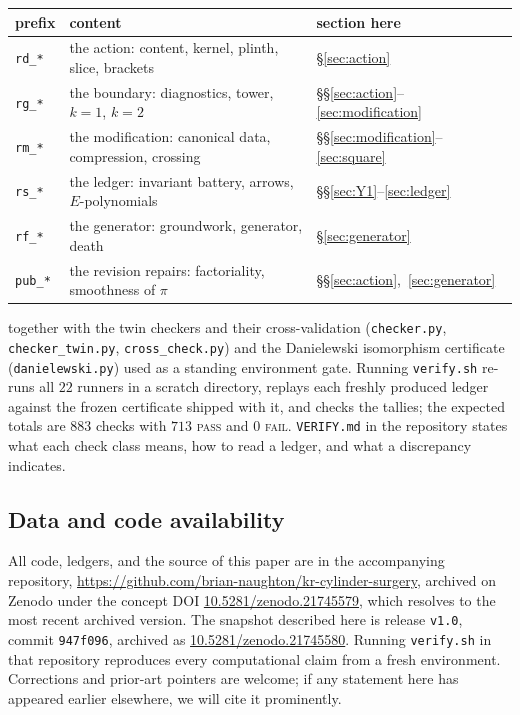 \documentclass[11pt]{article}
\theoremstyle{definition}
\theoremstyle{remark}
\begin{document}
\begin{center}
\begin{tabular}{lll}
\hline
prefix & content & section here\\\hline
\texttt{rd\_*} & the action: content, kernel, plinth, slice, brackets &
\S\ref{sec:action}\\
\texttt{rg\_*} & the boundary: diagnostics, tower, $k=1$, $k=2$ &
\S\S\ref{sec:action}--\ref{sec:modification}\\
\texttt{rm\_*} & the modification: canonical data, compression, crossing &
\S\S\ref{sec:modification}--\ref{sec:square}\\
\texttt{rs\_*} & the ledger: invariant battery, arrows, $E$-polynomials &
\S\S\ref{sec:Y1}--\ref{sec:ledger}\\
\texttt{rf\_*} & the generator: groundwork, generator, death &
\S\ref{sec:generator}\\
\texttt{pub\_*} & the revision repairs: factoriality, smoothness of $\pi$ &
\S\S\ref{sec:action},~\ref{sec:generator}\\
\hline
\end{tabular}
\end{center}

together with the twin checkers and their cross-validation
(\texttt{checker.py}, \texttt{checker\_twin.py}, \texttt{cross\_check.py}) and
the Danielewski isomorphism certificate (\texttt{danielewski.py}) used as a
standing environment gate. Running \texttt{verify.sh} re-runs all $22$ runners
in a scratch directory, replays each freshly produced ledger against the
frozen certificate shipped with it, and checks the tallies; the expected
totals are $883$ checks with $713$ \textsc{pass} and $0$ \textsc{fail}.
\texttt{VERIFY.md} in the repository states what each check class means, how
to read a ledger, and what a discrepancy indicates.

\subsection*{Data and code availability}

\begin{sloppypar}
All code, ledgers, and the source of this paper are in the accompanying
repository, \url{https://github.com/brian-naughton/kr-cylinder-surgery},
archived on Zenodo under the concept DOI
\href{https://doi.org/10.5281/zenodo.21745579}{10.5281/zenodo.21745579}, which
resolves to the most recent archived version. The snapshot described here is
release \texttt{v1.0}, commit \texttt{947f096}, archived as
\href{https://doi.org/10.5281/zenodo.21745580}{10.5281/zenodo.21745580}.
Running \texttt{verify.sh} in that repository reproduces every computational
claim from a fresh environment. Corrections and prior-art pointers are
welcome; if any statement here has appeared earlier elsewhere, we will cite it
prominently.
\end{sloppypar}
\end{document}
